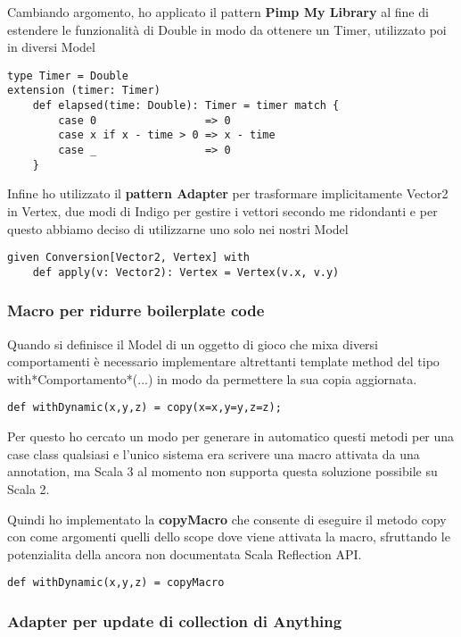 Cambiando argomento, ho applicato il pattern \textbf{Pimp My Library} al fine di estendere le funzionalità di Double in modo da ottenere un Timer, utilizzato poi in diversi Model 
\begin{lstlisting}[basicstyle=\tiny]
type Timer = Double
extension (timer: Timer)
    def elapsed(time: Double): Timer = timer match {
        case 0                 => 0
        case x if x - time > 0 => x - time
        case _                 => 0
    }
\end{lstlisting}

Infine ho utilizzato il \textbf{pattern Adapter} per trasformare implicitamente Vector2 in Vertex, due modi di Indigo per gestire i vettori secondo me ridondanti e per questo abbiamo deciso di utilizzarne uno solo nei nostri Model
\begin{lstlisting}[basicstyle=\tiny]
given Conversion[Vector2, Vertex] with
    def apply(v: Vector2): Vertex = Vertex(v.x, v.y)
\end{lstlisting}



\subsubsection{Macro per ridurre boilerplate code}
Quando si definisce il Model di un oggetto di gioco che mixa diversi comportamenti è necessario implementare altrettanti template method  del tipo with*Comportamento*(...) in modo da permettere la sua copia aggiornata. 

\begin{lstlisting}[basicstyle=\tiny]
def withDynamic(x,y,z) = copy(x=x,y=y,z=z); 
\end{lstlisting}

Per questo ho cercato un modo per generare in automatico questi metodi per una case class qualsiasi e l'unico sistema era scrivere una macro attivata da una annotation, ma Scala 3 al momento non supporta questa soluzione possibile su Scala 2.

Quindi ho implementato la \textbf{copyMacro} che consente di eseguire il metodo copy con come argomenti quelli dello scope dove viene attivata la macro, sfruttando le potenzialita della ancora non documentata Scala Reflection API. 

\begin{lstlisting}[basicstyle=\tiny]
def withDynamic(x,y,z) = copyMacro
\end{lstlisting}

\subsubsection{Adapter per update di collection di Anything}

